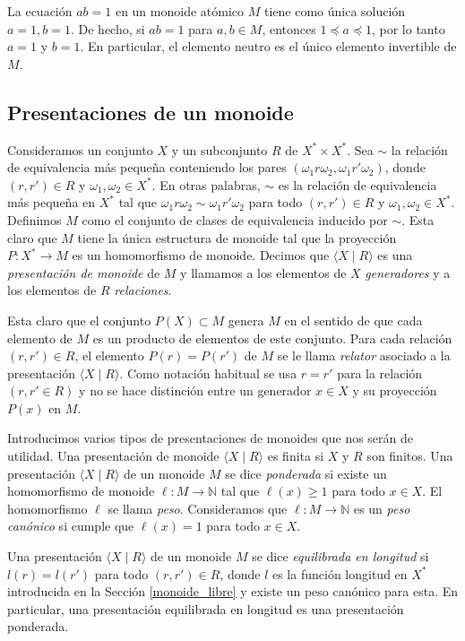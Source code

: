 \documentclass[12pt]{book}
\theoremstyle{definition}
\begin{document}
La ecuación $ab=1$ en un monoide atómico $M$ tiene como única solución $a=1,b=1$. De hecho, si $ab=1$ para $a,b\in M$, entonces $1\preceq a \preceq 1$, por lo tanto $a=1$ y $b=1$. En particular, el elemento neutro es el único elemento invertible de $M$.

\subsection{Presentaciones de un monoide}
Consideramos un conjunto $X$ y un subconjunto $R$ de $X^*\times X^*$. Sea $\sim$ la relación de equivalencia más pequeña conteniendo los pares $(\omega_1r\omega_2, \omega_1r'\omega_2)$, donde $(r,r')\in R$ y $\omega_1,\omega_2\in X^*$. En otras palabras, $\sim$ es la relación de equivalencia más pequeña en $X^*$ tal que $\omega_1r\omega_2\sim\omega_1r'\omega_2$ para todo $(r,r')\in R$ y $\omega_1,\omega_2\in X^*$. Definimos $M$ como el conjunto de clases de equivalencia inducido por $\sim$. Esta claro que $M$ tiene la única estructura de monoide tal que la proyección $P:X^*\rightarrow M$ es un homomorfismo de monoide. Decimos que $\langle X\mid R\rangle$ es una \textit{presentación de monoide} de $M$ y llamamos a los elementos de $X$ \textit{generadores} y a los elementos de $R$ \textit{relaciones}.

Esta claro que el conjunto $P(X)\subset M$ genera $M$ en el sentido de que cada elemento de $M$ es un producto de elementos de este conjunto. Para cada relación $(r,r')\in R$, el elemento $P(r)=P(r')$ de $M$ se le llama \textit{relator} asociado a la presentación $\langle X\mid R\rangle$. Como notación habitual se usa $r=r'$ para la relación $(r,r'\in R)$ y no se hace distinción entre un generador $x\in X$ y su proyección $P(x)$ en $M$. 




Introducimos varios tipos de presentaciones de monoides que nos serán de utilidad. Una presentación de monoide $\langle X\mid R\rangle$ es finita si $X$ y $R$ son finitos. Una presentación $\langle X\mid R\rangle$ de un monoide $M$ se dice \textit{ponderada} si existe un homomorfismo de monoide $\ell:M\rightarrow \mathbb{N}$ tal que $\ell(x)\geq 1$ para todo $x\in X$. El homomorfismo $\ell$ se llama \textit{peso}. Consideramos que $\ell:M\rightarrow \mathbb{N}$ es un \textit{peso canónico} si cumple que $\ell(x)=1$ para todo $x\in X$.

Una presentación $\langle X\mid R\rangle$ de un monoide $M$ se dice \textit{equilibrada en longitud} si $l(r)=l(r')$ para todo $(r,r')\in R$, donde $l$ es la función longitud en $X^*$ introducida en la Sección \ref{monoide_libre} y existe un peso canónico para esta. En particular, una presentación equilibrada en longitud es una presentación ponderada.
\end{document}
